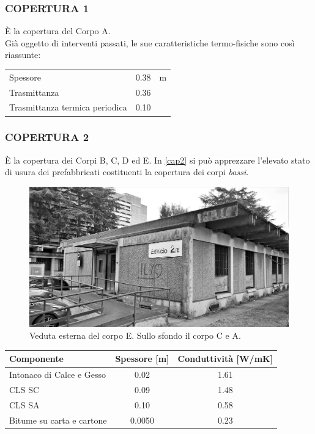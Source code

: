 \subsubsection{COPERTURA 1}
È la copertura del Corpo A.\\Già oggetto di interventi passati, le sue caratteristiche termo-fisiche sono così riassunte:
\begin{center}
	\begin{tabular}{lcc}
		\toprule
		Spessore & \num{0.38} & \si{m}\\
		Trasmittanza & \num{0.36} & \trasm\\
		Trasmittanza termica periodica & \num{0.10} & \trasm\\
		\bottomrule
	\end{tabular}
\end{center}
\subsubsection{COPERTURA 2}
È la copertura dei Corpi B, C, D ed E. In \vref{cap2} si può apprezzare l'elevato stato di usura dei prefabbricati costituenti la copertura dei corpi \emph{bassi}.
\begin{figure}[h]
	\centering
	\includegraphics[width=\textwidth]{6_2_cap/img/cop2}
	\caption{Veduta esterna del corpo E. Sullo sfondo il corpo C e A.}\label{cap2}
\end{figure}
\begin{center}
	\begin{tabular}{lcc}
		\toprule
		Componente & Spessore [m] & Conduttività [\si{W/mK}] \\
		\midrule
		Intonaco di Calce e Gesso & \num{0.02} & \num{1.61} \\
		CLS SC  & \num{0.09} & \num{1.48}\\
		CLS SA & \num{0.10} & \num{0.58} \\
		Bitume su carta e cartone & \num{0.0050} & \num{0.23} \\
		\bottomrule
	\end{tabular}
\end{center}
